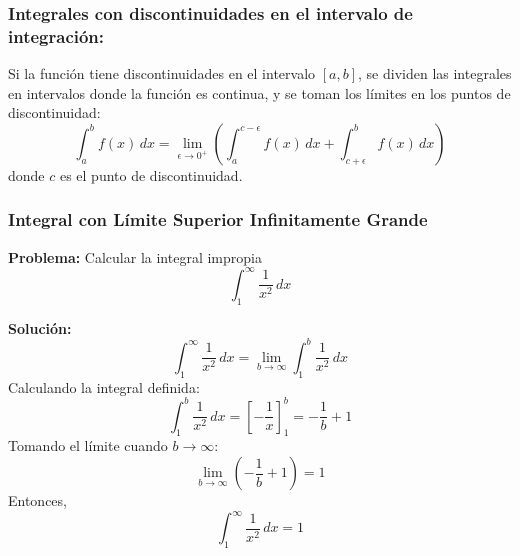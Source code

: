 \subsubsection{Integrales con discontinuidades en el intervalo de integración:}
   Si la función tiene discontinuidades en el intervalo \([a, b]\), se dividen las integrales en intervalos donde la función es continua, y se toman los límites en los puntos de discontinuidad:
 \begin{equation}
    \int_{a}^{b} f(x) \, dx = \lim_{\epsilon \to 0^+} \left(\int_{a}^{c - \epsilon} f(x) \, dx + \int_{c + \epsilon}^{b} f(x) \, dx\right)
 \end{equation}
   donde \(c\) es el punto de discontinuidad.

\subsubsection{Integral con Límite Superior Infinitamente Grande}

\begin{example}
    \textbf{Problema:} Calcular la integral impropia
\[
\int_{1}^{\infty} \frac{1}{x^2} \, dx
\]

\textbf{Solución:}
\[
\int_{1}^{\infty} \frac{1}{x^2} \, dx = \lim_{b \to \infty} \int_{1}^{b} \frac{1}{x^2} \, dx
\]
Calculando la integral definida:
\[
\int_{1}^{b} \frac{1}{x^2} \, dx = \left[ -\frac{1}{x} \right]_{1}^{b} = -\frac{1}{b} + 1
\]
Tomando el límite cuando \( b \to \infty \):
\[
\lim_{b \to \infty} \left(-\frac{1}{b} + 1\right) = 1
\]
Entonces,
\[
\int_{1}^{\infty} \frac{1}{x^2} \, dx = 1
\]

\begin{center}
\end{center}
\end{example}

